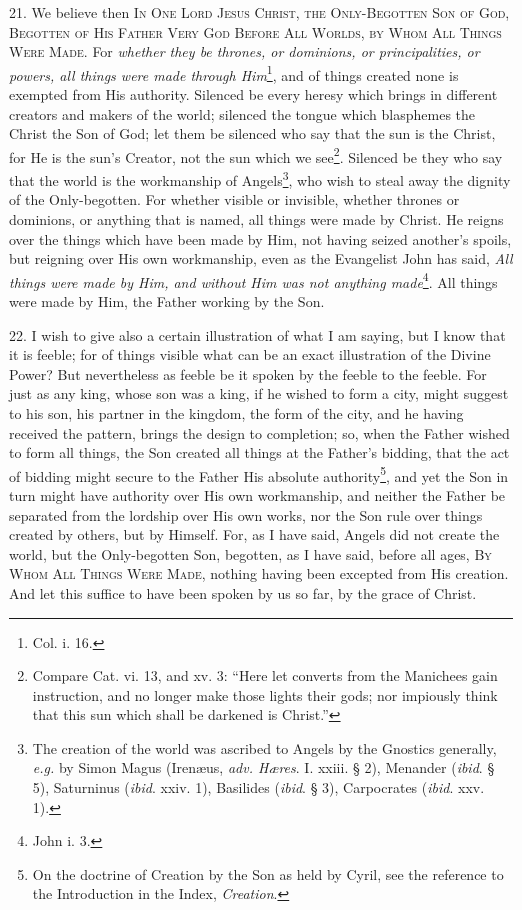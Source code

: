 21. We believe then \textsc{In One Lord Jesus Christ, the Only-Begotten Son of God, Begotten of His Father Very God Before All Worlds, by Whom All Things Were Made}. For \emph{whether they be thrones, or dominions, or principalities, or powers, all things were made through Him}\footnote{Col. i. 16.}, and of things created none is exempted from His authority. Silenced be every heresy which brings in different creators and makers of the world; silenced the tongue which blasphemes the Christ the Son of God; let them be silenced who say that the sun is the Christ, for He is the sun’s Creator, not the sun which we see\footnote{Compare Cat. vi. 13, and xv. 3: “Here let converts from the Manichees gain instruction, and no longer make those lights their gods; nor impiously think that this sun which shall be darkened is Christ.”}. Silenced be they who say that the world is the workmanship of Angels\footnote{The creation of the world was ascribed to Angels by the Gnostics generally, \emph{e.g.} by Simon Magus (Irenæus, \emph{adv. Hæres}. I. xxiii. § 2), Menander (\emph{ibid}. § 5), Saturninus (\emph{ibid}. xxiv. 1), Basilides (\emph{ibid}. § 3), Carpocrates (\emph{ibid}. xxv. 1).}, who wish to steal away the dignity of the Only-begotten. For whether visible or invisible, whether thrones or dominions, or anything that is named, all things were made by Christ. He reigns over the things which have been made by Him, not having seized another’s spoils, but reigning over His own workmanship, even as the Evangelist John has said, \emph{All things were made by Him, and without Him was not anything made}\footnote{John i. 3.}. All things were made by Him, the Father working by the Son.

22. I wish to give also a certain illustration of what I am saying, but I know that it is feeble; for of things visible what can be an exact illustration of the Divine Power? But nevertheless as feeble be it spoken by the feeble to the feeble. For just as any king, whose son was a king, if he wished to form a city, might suggest to his son, his partner in the kingdom, the form of the city, and he having received the pattern, brings the design to completion; so, when the Father wished to form all things, the Son created all things at the Father’s bidding, that the act of bidding might secure to the Father His absolute authority\footnote{On the doctrine of Creation by the Son as held by Cyril, see the reference to the Introduction in the Index, \emph{Creation}.}, and yet the Son in turn might have authority over His own workmanship, and neither the Father be separated from the lordship over His own works, nor the Son rule over things created by others, but by Himself. For, as I have said, Angels did not create the world, but the Only-begotten Son, begotten, as I have said, before all ages, \textsc{By Whom All Things Were Made}, nothing having been excepted from His creation. And let this suffice to have been spoken by us so far, by the grace of Christ.

